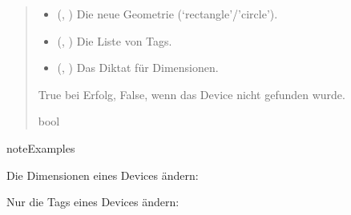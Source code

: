 \documentclass[letterpaper,10pt,english]{sphinxmanual}
\begin{document}
\begin{fulllineitems}
\begin{fulllineitems}
\begin{quote}
\begin{description}
\begin{itemize}
\item {} 
\sphinxAtStartPar
{} (, ) \textendash{} Die neue Geometrie (‘rectangle’/’circle’).

\item {} 
\sphinxAtStartPar
{} (, ) \textendash{} Die  Liste von Tags.

\item {} 
\sphinxAtStartPar
{} (, ) \textendash{} Das  Diktat
für Dimensionen.

\end{itemize}

\sphinxAtStartPar
True bei Erfolg, False, wenn das Device nicht gefunden wurde.

\sphinxAtStartPar
bool

\end{description}\end{quote}

\begin{sphinxadmonition}{note}{Examples}

\sphinxAtStartPar
Die Dimensionen eines Devices ändern:

\begin{sphinxVerbatim}[commandchars=\\\{\}]
     
 
\end{sphinxVerbatim}

\sphinxAtStartPar
Nur die Tags eines Devices ändern:

\begin{sphinxVerbatim}[commandchars=\\\{\}]
 \PYG{p}{[} \PYG{p}{]}
\end{sphinxVerbatim}
\end{sphinxadmonition}


\end{fulllineitems}
\end{fulllineitems}
\end{document}
